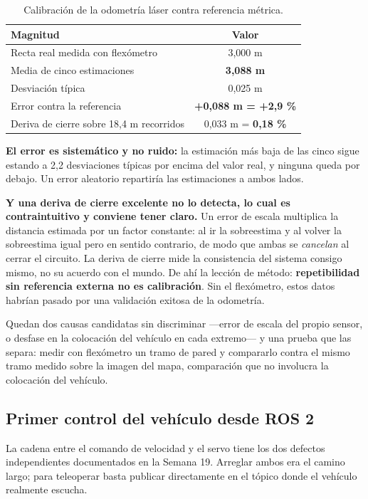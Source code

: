 \documentclass[12pt,letterpaper]{article}
\begin{document}
\begin{table}[H]
    \centering
    \small
    \caption{Calibración de la odometría láser contra referencia métrica.}
    \label{tab:odom_laser}
    \begin{tabular}{@{}lc@{}}
        \toprule
        \textbf{Magnitud} & \textbf{Valor} \\ \midrule
        Recta real medida con flexómetro & 3,000 m \\
        Media de cinco estimaciones & \textbf{3,088 m} \\
        Desviación típica & 0,025 m \\
        Error contra la referencia & \textbf{+0,088 m = +2,9 \%} \\
        Deriva de cierre sobre 18,4 m recorridos & 0,033 m = \textbf{0,18 \%} \\ \bottomrule
    \end{tabular}
\end{table}

\textbf{El error es sistemático y no ruido:} la estimación más baja de las cinco sigue estando a 2,2 desviaciones típicas por encima del valor real, y ninguna queda por debajo. Un error aleatorio repartiría las estimaciones a ambos lados.

\textbf{Y una deriva de cierre excelente no lo detecta, lo cual es contraintuitivo y conviene tener claro.} Un error de escala multiplica la distancia estimada por un factor constante: al ir la sobreestima y al volver la sobreestima igual pero en sentido contrario, de modo que ambas se \emph{cancelan} al cerrar el circuito. La deriva de cierre mide la consistencia del sistema consigo mismo, no su acuerdo con el mundo. De ahí la lección de método: \textbf{repetibilidad sin referencia externa no es calibración}. Sin el flexómetro, estos datos habrían pasado por una validación exitosa de la odometría.

Quedan dos causas candidatas sin discriminar ---error de escala del propio sensor, o desfase en la colocación del vehículo en cada extremo--- y una prueba que las separa: medir con flexómetro un tramo de pared y compararlo contra el mismo tramo medido sobre la imagen del mapa, comparación que no involucra la colocación del vehículo.

\subsection{Primer control del vehículo desde ROS 2}

La cadena entre el comando de velocidad y el servo tiene los dos defectos independientes documentados en la Semana 19. Arreglar ambos era el camino largo; para teleoperar basta publicar directamente en el tópico donde el vehículo realmente escucha.
\end{document}
